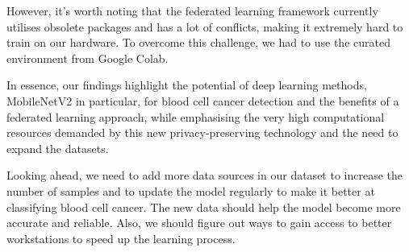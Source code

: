 \documentclass[runningheads,a4paper,11pt]{report}
\begin{document}
However, it's worth noting that the federated learning framework currently utilises obsolete packages and has a lot of conflicts, making it extremely hard to train on our hardware. To overcome this challenge, we had to use the curated environment from Google Colab.

In essence, our findings highlight the potential of deep learning methods, MobileNetV2\cite{sandler2018mobilenetv2}  in particular, for blood cell cancer detection and the benefits of a federated learning approach, while emphasising the very high computational resources demanded by this new privacy-preserving technology and the need to expand the datasets. 

Looking ahead, we need to add more data sources in our dataset to increase the number of samples and to update the model regularly to make it better at classifying blood cell cancer. The new data should help the model become more accurate and reliable. Also, we should figure out ways to gain access to better workstations to speed up the learning process.




\end{document}
